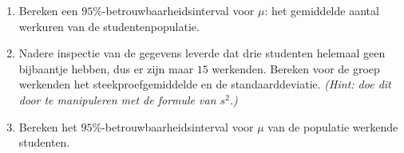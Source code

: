 \begin{enumerate}[label=(\alph*)]
    \item Bereken een $95\%$-betrouwbaarheidsinterval voor $\mu$: het gemiddelde aantal werkuren van de studentenpopulatie.
    \answer{

    }

    \item Nadere inspectie van de gegevens leverde dat drie studenten helemaal geen bijbaantje hebben, dus er zijn maar $15$ werkenden.
    Bereken voor de groep werkenden het steekproefgemiddelde en de standaarddeviatie.
    \emph{(Hint: doe dit door te manipuleren met de formule van $s^2$.)}
    \answer{

    }

    \item Bereken het $95\%$-betrouwbaarheidsinterval voor $\mu$ van de populatie werkende studenten.
    \answer{
        
    }
\end{enumerate}

